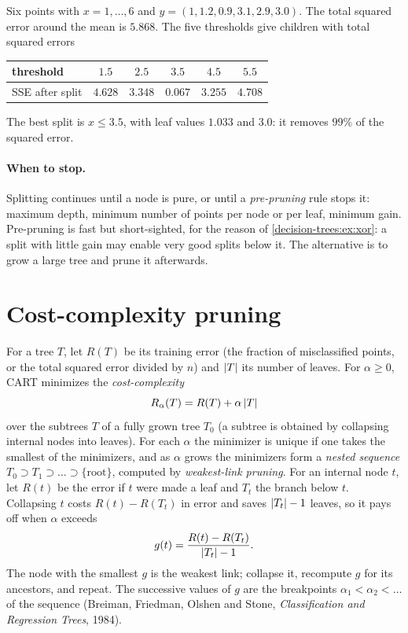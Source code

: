 \begin{notechapter}
\begin{example}\label{decision-trees:ex:stump}
Six points with $x = 1,\dots,6$ and $y = (1, 1.2, 0.9, 3.1, 2.9, 3.0)$. The total squared error around
the mean is $5.868$. The five thresholds give children with total squared errors
\begin{center}
\begin{tabular}{@{}lccccc@{}}
\toprule
threshold & $1.5$ & $2.5$ & $3.5$ & $4.5$ & $5.5$ \\
\midrule
SSE after split & $4.628$ & $3.348$ & $0.067$ & $3.255$ & $4.708$ \\
\bottomrule
\end{tabular}
\end{center}
The best split is $x\leq3.5$, with leaf values $1.033$ and $3.0$: it removes $99\%$ of the squared
error.
\end{example}

\paragraph{When to stop.} Splitting continues until a node is pure, or until a
\emph{pre-pruning} rule stops it: maximum depth, minimum number of points per node or
per leaf, minimum gain. Pre-pruning is fast but short-sighted, for the reason of
\cref{decision-trees:ex:xor}: a split with little gain may enable very good splits below
it. The alternative is to grow a large tree and prune it afterwards.

\section{Cost-complexity pruning}\label{decision-trees:sec:pruning}

For a tree $T$, let $R(T)$ be its training error (the fraction of misclassified points, or the
total squared error divided by $n$) and $\left|T\right|$ its number of leaves. For $\alpha\geq0$, CART
minimizes the \emph{cost-complexity}
\[
  R_\alpha(T) = R(T) + \alpha\left|T\right|
\]
over the subtrees $T$ of a fully grown tree $T_0$ (a subtree is obtained by collapsing
internal nodes into leaves). For each $\alpha$ the minimizer is unique if one takes the
smallest of the minimizers, and as $\alpha$ grows the minimizers form a \emph{nested sequence}
$T_0\supset T_1\supset\dots\supset\{\text{root}\}$, computed by \emph{weakest-link pruning}. For an internal node $t$, let $R(t)$ be
the error if $t$ were made a leaf and $T_t$ the branch below $t$. Collapsing $t$ costs $R(t) - R(T_t)$ in
error and saves $\left|T_t\right| - 1$ leaves, so it pays off when $\alpha$ exceeds
\[
  g(t) = \frac{R(t) - R(T_t)}{\left|T_t\right| - 1} .
\]
The node with the smallest $g$ is the weakest link; collapse it, recompute $g$ for its
ancestors, and repeat. The successive values of $g$ are the breakpoints $\alpha_1<\alpha_2<\dots$ of the
sequence (Breiman, Friedman, Olshen and Stone, \emph{Classification and Regression Trees},
1984).


\end{notechapter}
